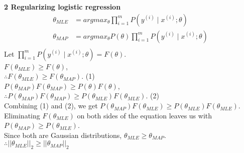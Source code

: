 \documentclass[12pt]{article}
\begin{document}
\pagebreak
\noindent \textbf{2 Regularizing logistic regression} \\
	\begin{align*}
	\theta_{MLE} &= argmax_{\theta} \prod_{i=1}^{m} P(y^{(i)}\mid x^{(i)}; \theta)\\
	\theta_{MAP} &= argmax_{\theta} P(\theta) \prod_{i=1}^{m} P(y^{(i)}\mid x^{(i)}; \theta)\\
	\end{align*}
	\indent Let $\prod_{i=1}^{m} P(y^{(i)}\mid x^{(i)}; \theta) = F(\theta)$. \\
	
	$F(\theta_{MLE}) \geq F(\theta)$,\\
	
	$\therefore F(\theta_{MLE}) \geq F(\theta_{MAP})$.  (1)\\
	
	$P(\theta_{MAP})F(\theta_{MAP}) \geq P(\theta)F(\theta)$, \\
	
	$\therefore P(\theta_{MAP})F(\theta_{MAP}) \geq P(\theta_{MLE})F(\theta_{MLE})$. (2)\\

	Combining (1) and (2), we get $P(\theta_{MAP})F(\theta_{MLE}) \geq P(\theta_{MLE})F(\theta_{MLE})$.\\
	
	Eliminating $F(\theta_{MLE})$ on both sides of the equation leaves us with $P(\theta_{MAP}) \geq P(\theta_{MLE})$.\\
	
	Since both are Gaussian distributions, $\theta_{MLE} \geq \theta_{MAP}$. \\

	$\therefore ||\theta_{MLE}||_{2} \geq ||\theta_{MAP}||_{2}$
\pagebreak
\end{document}
